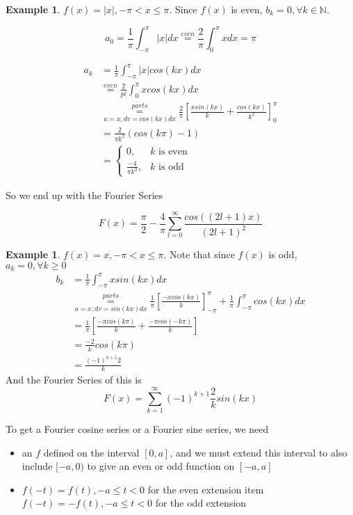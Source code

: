 \documentclass[12pt]{article}
\theoremstyle{plain}
\theoremstyle{definition}
\newtheorem{example}[theorem]{Example}
\begin{document}
\begin{example}
    $f(x) = |x|, -\pi < x \leq \pi$. Since $f(x)$ is even, $b_k=0, \forall k\in\mathbb{N}$.

    $$a_0 = \frac{1}{\pi} \int^\pi_{-\pi} |x|dx \overset{even}{=} \frac{2}{\pi} \int^\pi_0 x dx= \pi$$

   \begin{align*}
   	a_k &= \frac{1}{\pi} \int^\pi_{-\pi} |x| cos(kx) dx\\
	&\overset{even}{=} \frac{2}{pi} \int^\pi_0 x cos(kx) dx\\
	&\underset{u=x, dv=cos(kx)dx}{\overset{parts}{=}} \frac{2}{\pi} [\frac{x sin(kx)}{k} + \frac{cos(kx)}{k^2}]^\pi_0\\
	&= \frac{2}{\pi k^2} (cos(k\pi) - 1)\\
	&=\begin{cases}
		0, &\text{$k$ is even}\\
		\frac{-4}{\pi k^2}, &\text{$k$ is odd}
	\end{cases}
   \end{align*}

   So we end up with the Fourier Series

   $$F(x) = \frac{\pi}{2} - \frac{4}{\pi} \sum^\infty_{l=0} \frac{cos((2l+1)x)}{(2l+1)^2}$$

\end{example}

\begin{example}
	$f(x) = x, -\pi < x \leq \pi$. Note that since $f(x)$ is odd, $a_k = 0, \forall k \geq 0$
	\begin{align*}
		b_k &= \frac{1}{\pi} \int^\pi_{-\pi} x sin(kx) dx\\
		&\underset{u=x, dv=sin(kx)dx}{\overset{parts}{=}} \frac{1}{\pi} [\frac{-xcos(kx)}{k}]^\pi_{-\pi} + \frac{1}{\pi} \int^\pi_{-\pi} cos(kx) dx\\
		&= \frac{1}{\pi} [\frac{-\pi cos(k\pi)}{k} + \frac{-\pi cos(-k\pi)}{k}]\\
		&= \frac{-2}{k} cos(k\pi)\\
		&= \frac{(-1)^{k+1} 2}{k}
	\end{align*}
	And the Fourier Series of this is
	$$F(x) = \sum^\infty_{k=1} (-1)^{k+1} \frac{2}{k} sin(kx)$$
\end{example}

To get a Fourier cosine series or a Fourier sine series, we need
\begin{itemize}
	\item{an $f$ defined on the interval $[0,a]$, and we must extend this interval to also include $[-a,0)$ to give an even or odd function on $[-a,a]$}
	\item{$f(-t)=f(t), -a\leq t < 0$ for the even extension}
	item{$f(-t)=-f(t), -a\leq t < 0$ for the odd extension}
\end{itemize}
\end{document}
